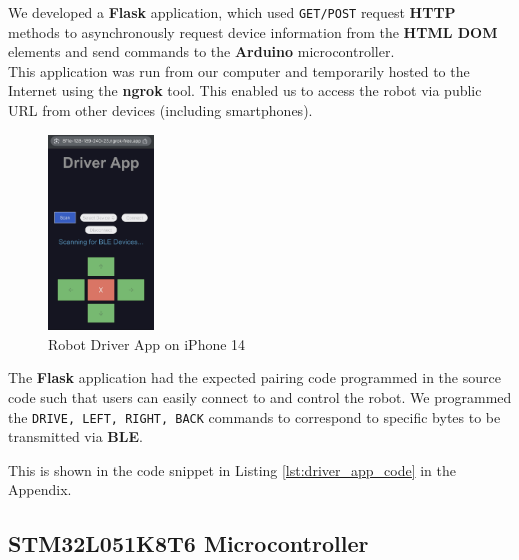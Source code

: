 \documentclass{article}
\begin{document}
\begin{minipage}{\linewidth}
    We developed a \textbf{Flask} application, which used \texttt{GET/POST} request \textbf{HTTP} methods
    to asynchronously request device information from the \textbf{HTML DOM} elements and send commands to the
    \textbf{Arduino} microcontroller. \\

    This application was run from our computer and temporarily hosted to the Internet using the \textbf{ngrok} tool.
    This enabled us to access the robot via public URL from other devices (including smartphones).
\end{minipage}\vspace{0.5cm}

\begin{figure}[H]
    \centering
    \includegraphics[width=0.25\textwidth]{Figures/Robot_Driver_App.jpg}
    \caption{Robot Driver App on iPhone 14}
    \label{fig:ble_app}
\end{figure}

\begin{minipage}{\linewidth}
    The \textbf{Flask} application had the expected pairing code programmed in the source code such that users can easily connect to and control the robot.
    We programmed the \texttt{DRIVE, LEFT, RIGHT, BACK} commands to correspond to specific bytes to be transmitted via \textbf{BLE}. \\
\end{minipage}

\begin{center}
    This is shown in the code snippet in Listing \ref{lst:driver_app_code} in the Appendix.
\end{center}

\subsection{STM32L051K8T6 Microcontroller}
\label{sec:stm32}
\end{document}
